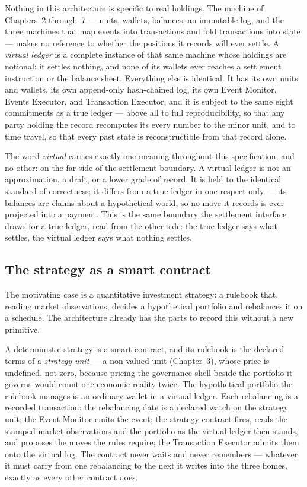 \documentclass[11pt,a4paper]{article}
\begin{document}
Nothing in this architecture is specific to real holdings. The machine of
Chapters~2 through~7 --- units, wallets, balances, an immutable log, and the
three machines that map events into transactions and fold transactions into
state --- makes no reference to whether the positions it records will ever
settle. A \emph{virtual ledger} is a complete instance of that same machine
whose holdings are notional: it settles nothing, and none of its wallets ever
reaches a settlement instruction or the balance sheet. Everything else is
identical. It has its own units and wallets, its own append-only hash-chained
log, its own Event Monitor, Events Executor, and Transaction Executor, and it is
subject to the same eight commitments as a true ledger --- above all to full
reproducibility, so that any party holding the record recomputes its every
number to the minor unit, and to time travel, so that every past state is
reconstructible from that record alone.

The word \emph{virtual} carries exactly one meaning throughout this
specification, and no other: on the far side of the settlement boundary. A
virtual ledger is not an approximation, a draft, or a lower grade of record. It
is held to the identical standard of correctness; it differs from a true ledger
in one respect only --- its balances are claims about a hypothetical world, so
no move it records is ever projected into a payment. This is the same boundary
the settlement interface draws for a true ledger, read from the other side: the
true ledger says what settles, the virtual ledger says what nothing settles.

\subsection{The strategy as a smart contract}

The motivating case is a quantitative investment strategy: a rulebook that,
reading market observations, decides a hypothetical portfolio and rebalances it
on a schedule. The architecture already has the parts to record this without a
new primitive.

A deterministic strategy is a smart contract, and its rulebook is the declared
terms of a \emph{strategy unit} --- a non-valued unit (Chapter~3), whose price is
undefined, not zero, because pricing the governance shell beside the portfolio it
governs would count one economic reality twice. The hypothetical portfolio the
rulebook manages is an ordinary wallet in a virtual ledger. Each rebalancing is a
recorded transaction: the rebalancing date is a declared watch on the strategy
unit; the Event Monitor emits the event; the strategy contract fires, reads the
stamped market observations and the portfolio as the virtual ledger then stands,
and proposes the moves the rules require; the Transaction Executor admits them
onto the virtual log. The contract never waits and never remembers --- whatever
it must carry from one rebalancing to the next it writes into the three homes,
exactly as every other contract does.
\end{document}
